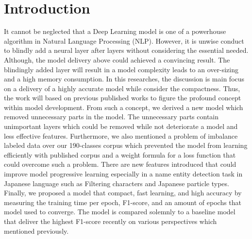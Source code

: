 \section{Introduction}
It cannot be neglected that a Deep Learning model is one of a powerhouse algorithm in Natural Language Processing (NLP).
However, it is unwise conduct to blindly add a neural layer after layers without considering the essential needed.
Although, the model delivery above could achieved a convincing result.
The blindingly added layer will result in a model complexity leads to an over-sizing and a high memory consumption.
In this researches, the discussion is main focus on a delivery of a highly accurate model while consider the compactness.
Thus, the work will based on previous published works to figure the profound concept within model development.
From such a concept, we derived a new model which removed unnecessary parts in the model.
The unnecessary parts contain unimportant layers which could be removed while not deteriorate a model and less effective features.
Furthermore, we also mentioned a problem of imbalance labeled data over our 190-classes corpus which prevented the model from learning efficiently with published corpus and a weight formula for a loss function that could overcome such a problem.
There are new features introduced that could improve model progressive learning especially in a name entity detection task in Japanese language such as Filtering characters and Japanese particle types.
Finally, we proposed a model that compact, fast learning, and high accuracy by measuring the training time per epoch, F1-score, and an amount of epochs that model used to converge.
The model is compared solemnly to a baseline model that deliver the highest F1-score recently on various perspectives which mentioned previously.